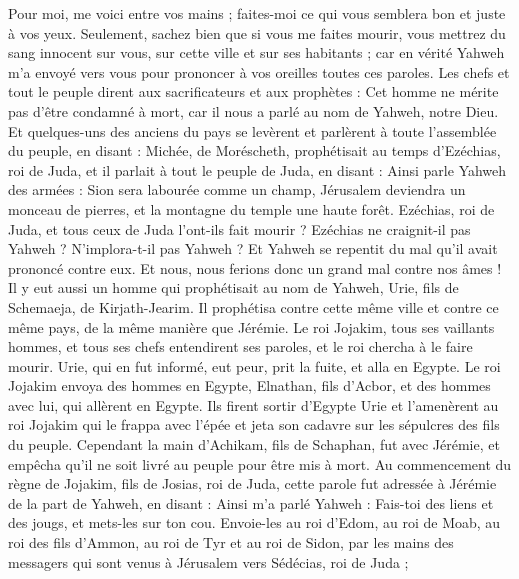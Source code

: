 \begin{multicols}{2}
Pour moi, me voici entre vos mains ; faites-moi ce qui vous semblera bon et juste à vos yeux.
Seulement, sachez bien que si vous me faites mourir, vous mettrez du sang innocent sur vous, sur cette ville et sur ses habitants ; car en vérité Yahweh m'a envoyé vers vous pour prononcer à vos oreilles toutes ces paroles.
Les chefs et tout le peuple dirent aux sacrificateurs et aux prophètes : Cet homme ne mérite pas d'être condamné à mort, car il nous a parlé au nom de Yahweh, notre Dieu.
Et quelques-uns des anciens du pays se levèrent et parlèrent à toute l'assemblée du peuple, en disant :
Michée, de Moréscheth, prophétisait au temps d'Ezéchias, roi de Juda, et il parlait à tout le peuple de Juda, en disant : Ainsi parle Yahweh des armées : Sion sera labourée comme un champ, Jérusalem deviendra un monceau de pierres, et la montagne du temple une haute forêt.
Ezéchias, roi de Juda, et tous ceux de Juda l'ont-ils fait mourir ? Ezéchias ne craignit-il pas Yahweh ? N'implora-t-il pas Yahweh ? Et Yahweh se repentit du mal qu'il avait prononcé contre eux. Et nous, nous ferions donc un grand mal contre nos âmes !
Il y eut aussi un homme qui prophétisait au nom de Yahweh, Urie, fils de Schemaeja, de Kirjath-Jearim. Il prophétisa contre cette même ville et contre ce même pays, de la même manière que Jérémie.
Le roi Jojakim, tous ses vaillants hommes, et tous ses chefs entendirent ses paroles, et le roi chercha à le faire mourir. Urie, qui en fut informé, eut peur, prit la fuite, et alla en Egypte.
Le roi Jojakim envoya des hommes en Egypte, Elnathan, fils d'Acbor, et des hommes avec lui, qui allèrent en Egypte.
Ils firent sortir d'Egypte Urie et l'amenèrent au roi Jojakim qui le frappa avec l'épée et jeta son cadavre sur les sépulcres des fils du peuple.
Cependant la main d'Achikam, fils de Schaphan, fut avec Jérémie, et empêcha qu'il ne soit livré au peuple pour être mis à mort.
\VerseOne{}Au commencement du règne de Jojakim, fils de Josias, roi de Juda, cette parole fut adressée à Jérémie de la part de Yahweh, en disant :
Ainsi m'a parlé Yahweh : Fais-toi des liens et des jougs, et mets-les sur ton cou.
Envoie-les au roi d'Edom, au roi de Moab, au roi des fils d'Ammon, au roi de Tyr et au roi de Sidon, par les mains des messagers qui sont venus à Jérusalem vers Sédécias, roi de Juda ;

\end{multicols}
